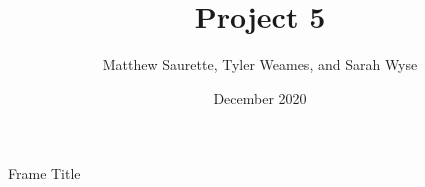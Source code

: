 \documentclass{beamer}
\title{Project 5}
\author[Matthew, Tyler, and Sarah]{Matthew Saurette, Tyler Weames, and Sarah Wyse}
\institute[Math 462]{Math 462\\ University of British Columbia - Okanagan}
\date{December 2020}
\begin{document}
\maketitle

\begin{frame}{Frame Title}
    
\end{frame}
\end{document}
